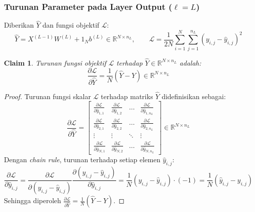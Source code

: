 \documentclass[11pt,a4paper]{article}
\def\mathbf#1{#1}%
\theoremstyle{plain}
\newtheorem{claim}{Claim}[section]
\theoremstyle{definition}
\theoremstyle{remark}
\begin{document}
\subsubsection{Turunan Parameter pada Layer Output (\texorpdfstring{$\ell = L$}{l = L})}
\label{subsubsec:gradien_layer_L_reparam}

\noindent Diberikan $\hat{Y}$ dan fungsi objektif $\mathcal{L}$:
\begin{equation}
    \hat{Y} = X^{(L-1)} W^{(L)} + \mathbf{1}_N \mathbf{b}^{(L)} \in \mathbb{R}^{N \times n_L}, \qquad
    \mathcal{L} = \frac{1}{2N} \sum_{i=1}^N \sum_{j=1}^{n_L} \left( y_{i, j} - \hat{y}_{i, j} \right)^2 \label{eq:output_loss_reparam}
\end{equation}

\begin{claim}
Turunan fungsi objektif $\mathcal{L}$ terhadap $\hat{Y} \in \mathbb{R}^{N \times n_L}$ adalah:
\begin{equation}
    \frac{\partial \mathcal{L}}{\partial \hat{Y}} = \frac{1}{N} \left( \hat{Y} - Y \right) \in \mathbb{R}^{N \times n_L} \label{eq:claim_dL_dYhat_reparam}
\end{equation}
\end{claim}
\begin{proof}
Turunan fungsi skalar $\mathcal{L}$ terhadap matriks $\hat{Y}$ didefinisikan sebagai:
\begin{equation}
    \frac{\partial \mathcal{L}}{\partial \hat{Y}} = \begin{bmatrix}
        \frac{\partial \mathcal{L}}{\partial \hat{y}_{1, 1}} & \frac{\partial \mathcal{L}}{\partial \hat{y}_{1, 2}} & \dots & \frac{\partial \mathcal{L}}{\partial \hat{y}_{1, n_L}} \\
        \frac{\partial \mathcal{L}}{\partial \hat{y}_{2, 1}} & \frac{\partial \mathcal{L}}{\partial \hat{y}_{2, 2}} & \dots & \frac{\partial \mathcal{L}}{\partial \hat{y}_{2, n_L}} \\
        \vdots & \vdots & \ddots & \vdots \\
        \frac{\partial \mathcal{L}}{\partial \hat{y}_{N, 1}} & \frac{\partial \mathcal{L}}{\partial \hat{y}_{N, 2}} & \dots & \frac{\partial \mathcal{L}}{\partial \hat{y}_{N, n_L}}
    \end{bmatrix} \in \mathbb{R}^{N \times n_L}
\end{equation}
Dengan \textit{chain rule}, turunan terhadap setiap elemen $\hat{y}_{i, j}$:
\begin{equation}
    \frac{\partial \mathcal{L}}{\partial \hat{y}_{i, j}} = \frac{\partial \mathcal{L}}{\partial (y_{i, j} - \hat{y}_{i, j})} \frac{\partial (y_{i, j} - \hat{y}_{i, j})}{\partial \hat{y}_{i, j}} = \frac{1}{N} (y_{i, j} - \hat{y}_{i, j}) \cdot (-1) = \frac{1}{N} (\hat{y}_{i, j} - y_{i, j})
\end{equation}
Sehingga diperoleh $\frac{\partial \mathcal{L}}{\partial \hat{Y}} = \frac{1}{N} \left( \hat{Y} - Y \right)$.
\end{proof}
\end{document}
